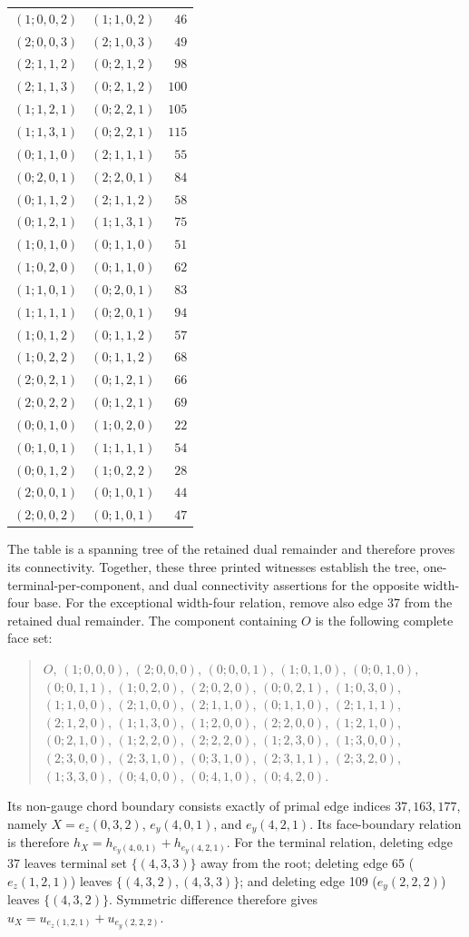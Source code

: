 \begin{longtable}{@{}rrr@{}}
$(1;0,0,2)$ & $(1;1,0,2)$ & $46$\\
$(2;0,0,3)$ & $(2;1,0,3)$ & $49$\\
$(2;1,1,2)$ & $(0;2,1,2)$ & $98$\\
$(2;1,1,3)$ & $(0;2,1,2)$ & $100$\\
$(1;1,2,1)$ & $(0;2,2,1)$ & $105$\\
$(1;1,3,1)$ & $(0;2,2,1)$ & $115$\\
$(0;1,1,0)$ & $(2;1,1,1)$ & $55$\\
$(0;2,0,1)$ & $(2;2,0,1)$ & $84$\\
$(0;1,1,2)$ & $(2;1,1,2)$ & $58$\\
$(0;1,2,1)$ & $(1;1,3,1)$ & $75$\\
$(1;0,1,0)$ & $(0;1,1,0)$ & $51$\\
$(1;0,2,0)$ & $(0;1,1,0)$ & $62$\\
$(1;1,0,1)$ & $(0;2,0,1)$ & $83$\\
$(1;1,1,1)$ & $(0;2,0,1)$ & $94$\\
$(1;0,1,2)$ & $(0;1,1,2)$ & $57$\\
$(1;0,2,2)$ & $(0;1,1,2)$ & $68$\\
$(2;0,2,1)$ & $(0;1,2,1)$ & $66$\\
$(2;0,2,2)$ & $(0;1,2,1)$ & $69$\\
$(0;0,1,0)$ & $(1;0,2,0)$ & $22$\\
$(0;1,0,1)$ & $(1;1,1,1)$ & $54$\\
$(0;0,1,2)$ & $(1;0,2,2)$ & $28$\\
$(2;0,0,1)$ & $(0;1,0,1)$ & $44$\\
$(2;0,0,2)$ & $(0;1,0,1)$ & $47$\\
\bottomrule
\end{longtable}
The table is a spanning tree of the retained dual remainder and therefore proves its connectivity.  Together, these three printed witnesses establish the tree, one-terminal-per-component, and dual connectivity assertions for the opposite width-four base.
For the exceptional width-four relation, remove also edge 37 from the retained dual remainder.  The component containing $O$ is the following complete face set:
\begin{quote}\small $O$, $(1;0,0,0)$, $(2;0,0,0)$, $(0;0,0,1)$, $(1;0,1,0)$, $(0;0,1,0)$, $(0;0,1,1)$, $(1;0,2,0)$, $(2;0,2,0)$, $(0;0,2,1)$, $(1;0,3,0)$, $(1;1,0,0)$, $(2;1,0,0)$, $(2;1,1,0)$, $(0;1,1,0)$, $(2;1,1,1)$, $(2;1,2,0)$, $(1;1,3,0)$, $(1;2,0,0)$, $(2;2,0,0)$, $(1;2,1,0)$, $(0;2,1,0)$, $(1;2,2,0)$, $(2;2,2,0)$, $(1;2,3,0)$, $(1;3,0,0)$, $(2;3,0,0)$, $(2;3,1,0)$, $(0;3,1,0)$, $(2;3,1,1)$, $(2;3,2,0)$, $(1;3,3,0)$, $(0;4,0,0)$, $(0;4,1,0)$, $(0;4,2,0)$.\end{quote}
Its non-gauge chord boundary consists exactly of primal edge indices $37,163,177$, namely $X=e_z(0,3,2)$, $e_y(4,0,1)$, and $e_y(4,2,1)$.  Its face-boundary relation is therefore $h_X=h_{e_y(4,0,1)}+h_{e_y(4,2,1)}$.
For the terminal relation, deleting edge 37 leaves terminal set $\{(4,3,3)\}$ away from the root; deleting edge 65 ($e_z(1,2,1)$) leaves $\{(4,3,2),(4,3,3)\}$; and deleting edge 109 ($e_y(2,2,2)$) leaves $\{(4,3,2)\}$.  Symmetric difference therefore gives $u_X=u_{e_z(1,2,1)}+u_{e_y(2,2,2)}$.
